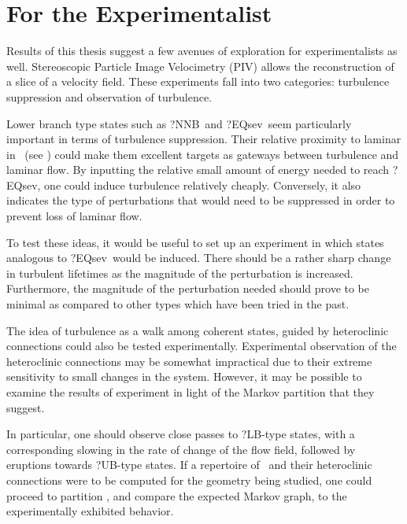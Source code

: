 %

\section{For the Experimentalist}


Results of this thesis suggest a few avenues of exploration for experimentalists as well.
Stereoscopic Particle Image Velocimetry (PIV) allows the reconstruction of a slice
of a velocity field.  These experiments fall into two categories: turbulence suppression and
observation of turbulence.

Lower branch type states such as ?NNB\ and ?EQsev\ seem
particularly important in terms of turbulence suppression.  Their relative proximity to laminar
in \statesp\ (see )
could make them excellent targets as gateways between turbulence and laminar flow.
By inputting the relative small amount of energy needed to reach ?EQsev, one could induce
turbulence relatively cheaply.  Conversely, it also indicates the type of perturbations that would need
to be suppressed in order to prevent loss of laminar flow.

To test these ideas, it would be useful to set up an experiment in which states analogous
to ?EQsev\ would be induced.  There should be a rather sharp change in turbulent lifetimes
as the magnitude of the perturbation is increased.  Furthermore, the magnitude of the perturbation
needed should prove to be minimal as compared to other types which have been tried in the past.

The idea of turbulence as a walk among coherent states, guided by heteroclinic connections could
also be tested experimentally.  Experimental observation of the heteroclinic connections may be somewhat impractical
due to their extreme sensitivity to small changes in the system.  However, it may be possible
to examine the results of experiment in light of the Markov partition that they suggest.

In particular, one should observe close passes to ?LB-type states, with a
corresponding slowing in the rate of change of the flow field, followed by eruptions
towards ?UB-type states.  If a repertoire of \eqva\ and their heteroclinic connections were to be computed
for the geometry being studied, one could proceed to partition \statesp, and compare
the expected Markov graph, to the experimentally exhibited behavior.
